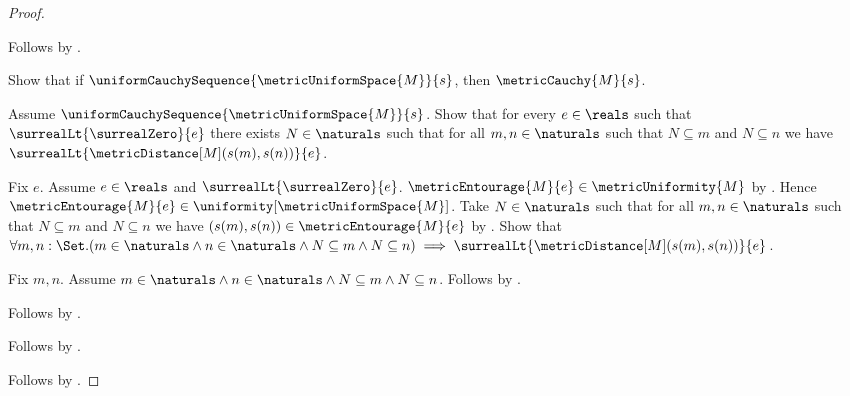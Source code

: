 \begin{proof}
\begin{subproof}
\begin{subproof}
        \end{subproof}
        Follows by .
    \end{subproof}
    Show that if
        $\uniformCauchySequence{\metricUniformSpace{M}}{s}$, then
        $\metricCauchy{M}{s}$.
    \begin{subproof}
        Assume $\uniformCauchySequence{\metricUniformSpace{M}}{s}$.
        Show that for every $e\in\reals$ such that
            $\surrealLt{\surrealZero}{e}$ there exists $N\in\naturals$
            such that for all $m,n\in\naturals$ such that
                $N\subseteq m$ and $N\subseteq n$ we have
                $\surrealLt{\metricDistance[M](s(m),s(n))}{e}$.
        \begin{subproof}
            Fix $e$.
            Assume $e\in\reals$ and
                $\surrealLt{\surrealZero}{e}$.
            $\metricEntourage{M}{e}\in\metricUniformity{M}$
                by .
            Hence
                $\metricEntourage{M}{e}
                    \in\uniformity[\metricUniformSpace{M}]$.
            Take $N\in\naturals$ such that for all $m,n\in\naturals$
                such that $N\subseteq m$ and $N\subseteq n$ we have
                $(s(m),s(n))\in\metricEntourage{M}{e}$
                by .
            Show that
                $\forall m,n:\Set.
                    (m\in\naturals\land n\in\naturals\land
                     N\subseteq m\land N\subseteq n)
                    \implies
                    \surrealLt{\metricDistance[M](s(m),s(n))}{e}$.
            \begin{subproof}
                Fix $m,n$.
                Assume
                    $m\in\naturals\land n\in\naturals\land
                    N\subseteq m\land N\subseteq n$.
                Follows by .
            \end{subproof}
            Follows by \auto.
        \end{subproof}
        Follows by .
    \end{subproof}
    Follows by \auto.
\end{proof}

